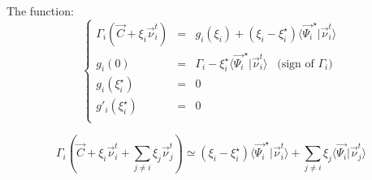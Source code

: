 \documentclass[aps,12pt]{revtex4}
\begin{document}
The function:
\begin{equation}
\left\lbrace
\begin{array}{rcl}
	\Gamma_i \left(\vec{C} +  \xi_i \vec{\nu}^t_i\right) & = &
	 g_i(\xi_i) + 
	 \left(\xi_i - \xi_i^\star\right) 	\langle \vec{\Psi_i}^\star \vert \vec{\nu}^t_i \rangle\\
	 g_i(0)            & = & \Gamma_i - \xi_i^\star \langle \vec{\Psi_i}^\star \vert \vec{\nu}^t_i \rangle \;\;\; \text{(sign of $\Gamma_i$)}\\
	 g_i(\xi_i^\star)  & = & 0\\
	 g'_i(\xi_i^\star) & = & 0\\
	 \end{array}
\right.
\end{equation}

\begin{equation}
	\Gamma_i \left(\vec{C} +  \xi_i \vec{\nu}^t_i  + \sum_{j\not=i} \xi_j \vec{\nu}^t_j \right) 
	\simeq \left(\xi_i - \xi_i^\star\right)
	\langle \vec{\Psi_i}^\star \vert \vec{\nu}^t_i \rangle + \sum_{j\not=i} \xi_j \langle \vec{\Psi_i}  \vert \vec{\nu}^t_j \rangle
\end{equation} 	
\end{document}
